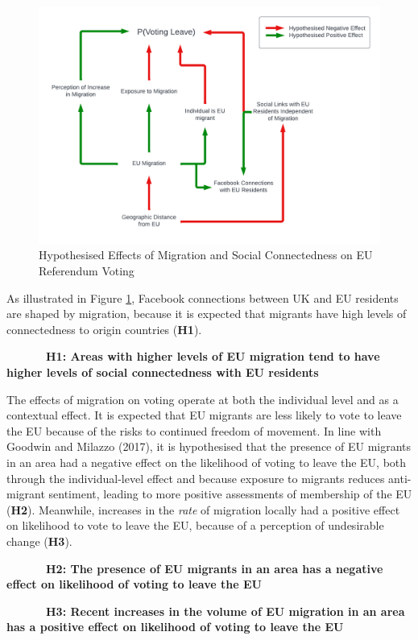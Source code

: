 \documentclass{article}
\begin{document}
\begin{figure}
\includegraphics[width=1\linewidth]{images/Effects} \caption{Hypothesised Effects of Migration and Social Connectedness on EU Referendum Voting}\label{fig:effects}
\end{figure}

As illustrated in Figure \ref{fig:effects}, Facebook connections between
UK and EU residents are shaped by migration, because it is expected that
migrants have high levels of connectedness to origin countries
(\textbf{H1}).

~~~~~~~\textbf{H1: Areas with higher levels of EU migration tend to have
higher levels of social connectedness with EU residents}

The effects of migration on voting operate at both the individual level
and as a contextual effect. It is expected that EU migrants are less
likely to vote to leave the EU because of the risks to continued freedom
of movement. In line with Goodwin and Milazzo (2017), it is hypothesised
that the presence of EU migrants in an area had a negative effect on the
likelihood of voting to leave the EU, both through the individual-level
effect and because exposure to migrants reduces anti-migrant sentiment,
leading to more positive assessments of membership of the EU
(\textbf{H2}). Meanwhile, increases in the \emph{rate} of migration
locally had a positive effect on likelihood to vote to leave the EU,
because of a perception of undesirable change (\textbf{H3}).

~~~~~~~\textbf{H2: The presence of EU migrants in an area has a negative
effect on likelihood of voting to leave the EU}

~~~~~~~\textbf{H3: Recent increases in the volume of EU migration in an
area has a positive effect on likelihood of voting to leave the EU }
\end{document}
